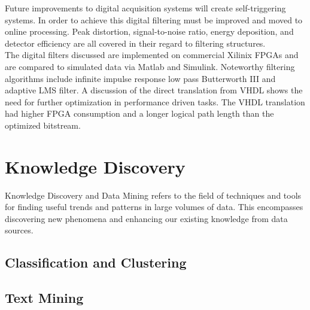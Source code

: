 \documentclass[12pt]{article}
\begin{document}
\begin{doublespacing}
\textbf{\cite{Alberto200999}}
Future improvements to digital acquisition systems will create self-triggering systems.
In order to achieve this digital filtering must be improved and moved to online processing.
Peak distortion, signal-to-noise ratio, energy deposition, and detector efficiency are all covered in their regard to filtering structures.
\\

The digital filters discussed are implemented on commercial Xilinix FPGAs and are compared to simulated data via Matlab and Simulink.
Noteworthy filtering algorithms include infinite impulse response low pass Butterworth III and adaptive LMS filter.
A discussion of the direct translation from VHDL shows the need for further optimization in performance driven tasks.
The VHDL translation had higher FPGA consumption and a longer logical path length than the optimized bitstream.




\pagebreak
\section{Knowledge Discovery}
Knowledge Discovery and Data Mining refers to the field of techniques and tools for finding useful trends and patterns in large volumes of data.
This encompasses discovering new phenomena and enhancing our existing knowledge from data sources.

\subsection{Classification and Clustering}

\subsection{Text Mining}


\pagebreak
\end{doublespacing}


\end{document}
